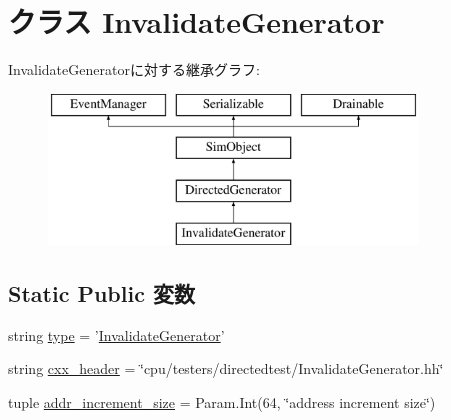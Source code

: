 \hypertarget{classRubyDirectedTester_1_1InvalidateGenerator}{
\section{クラス InvalidateGenerator}
\label{classRubyDirectedTester_1_1InvalidateGenerator}
}
InvalidateGeneratorに対する継承グラフ:\begin{figure}[H]
\begin{center}
\leavevmode
\includegraphics[height=4cm]{classRubyDirectedTester_1_1InvalidateGenerator}
\end{center}
\end{figure}
\subsection*{Static Public 変数}
\begin{DoxyCompactItemize}
\item 
string \hyperlink{classRubyDirectedTester_1_1InvalidateGenerator_acce15679d830831b0bbe8ebc2a60b2ca}{type} = '\hyperlink{classRubyDirectedTester_1_1InvalidateGenerator}{InvalidateGenerator}'
\item 
string \hyperlink{classRubyDirectedTester_1_1InvalidateGenerator_a17da7064bc5c518791f0c891eff05fda}{cxx\_\-header} = \char`\"{}cpu/testers/directedtest/InvalidateGenerator.hh\char`\"{}
\item 
tuple \hyperlink{classRubyDirectedTester_1_1InvalidateGenerator_a55a1d04584c3ff8e876c814204071ea5}{addr\_\-increment\_\-size} = Param.Int(64, \char`\"{}address increment size\char`\"{})
\end{DoxyCompactItemize}


